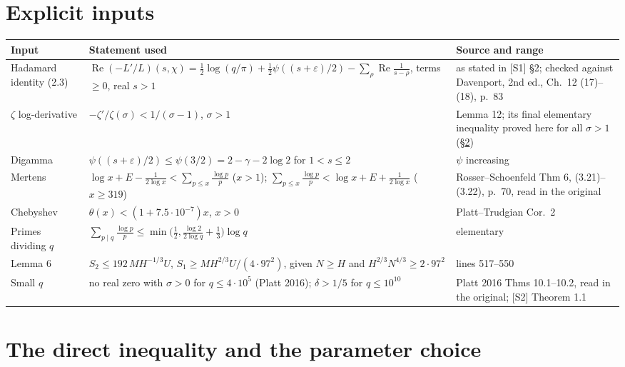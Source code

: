 \documentclass[11pt]{article}
\newcommand{\Rea}{\operatorname{Re}}
\begin{document}
\section{Explicit inputs}

{\small
\begin{tabularx}{\textwidth}{@{}>{\raggedright}p{2.6cm}>{\raggedright}X>{\raggedright\arraybackslash}p{4.4cm}@{}}
\toprule
Input & Statement used & Source and range\\
\midrule
Hadamard identity (2.3) & $\Rea(-L'/L)(s,\chi) = \tfrac12\log(q/\pi) + \tfrac12\psi((s+\varepsilon)/2) - \sum_\rho \Rea\frac{1}{s-\rho}$, terms $\ge 0$, real $s>1$ & as stated in [S1] \S2; checked against Davenport, 2nd ed., Ch.~12 (17)--(18), p.~83\\
$\zeta$ log-derivative & $-\zeta'/\zeta(\sigma) < 1/(\sigma-1)$, $\sigma>1$ & [S6] Lemma 12; its final elementary inequality proved here for all $\sigma>1$ (\S\ref{sec:direct})\\
Digamma & $\psi((s+\varepsilon)/2)\le\psi(3/2) = 2-\gamma-2\log 2$ for $1<s\le 2$ & $\psi$ increasing\\
Mertens & $\log x + E - \frac{1}{2\log x} < \sum_{p\le x}\frac{\log p}{p}$ ($x>1$); $\sum_{p\le x}\frac{\log p}{p} < \log x + E + \frac{1}{2\log x}$ ($x\ge 319$) & Rosser--Schoenfeld Thm 6, (3.21)--(3.22), p.~70, read in the original\\
Chebyshev & $\theta(x) < (1+7.5\cdot 10^{-7})x$, $x>0$ & [S5] Platt--Trudgian Cor.~2\\
Primes dividing $q$ & $\sum_{p\mid q}\frac{\log p}{p} \le \min\bigl(\tfrac12, \tfrac{\log 2}{2\log q}+\tfrac13\bigr)\log q$ & elementary\\
Lemma 6 & $S_2\le 192\,M H^{-1/3}U$, $S_1\ge M H^{2/3}U/(4\cdot 97^2)$, given $N\ge H$ and $H^{2/3}N^{4/3}\ge 2\cdot 97^2$ & [S1] lines 517--550\\
Small $q$ & no real zero with $\sigma>0$ for $q\le 4\cdot10^5$ (Platt 2016); $\delta>1/5$ for $q\le 10^{10}$ & Platt 2016 Thms 10.1--10.2, read in the original; [S2] Theorem 1.1\\
\bottomrule
\end{tabularx}
}

\section{The direct inequality and the parameter choice}\label{sec:direct}
\end{document}
